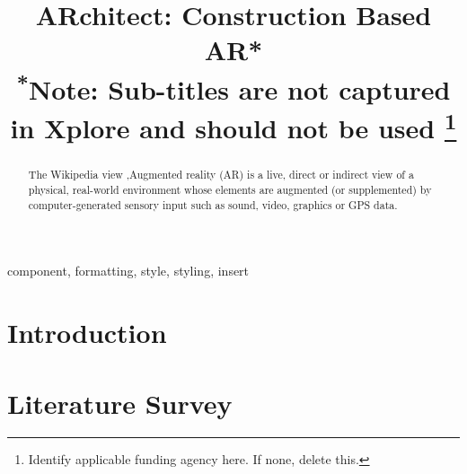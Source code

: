 \documentclass[conference]{IEEEtran}
\begin{document}
\title{ARchitect: Construction Based AR*\\
{\footnotesize \textsuperscript{*}Note: Sub-titles are not captured in Xplore and
should not be used}
\thanks{Identify applicable funding agency here. If none, delete this.}
}

\author{
\and
{}
\and
{}
\and
{}
}

\maketitle


\begin{abstract}
 The Wikipedia view ,Augmented reality (AR) is a live,
 direct or indirect view of a physical, real-world 
environment whose elements are augmented
 (or supplemented) by computer-generated sensory 
input such as sound, video, graphics or GPS data.
\end{abstract}

\begin{IEEEkeywords}
component, formatting, style, styling, insert
\end{IEEEkeywords}

\section{Introduction}
\section{Literature Survey}
\end{document}
